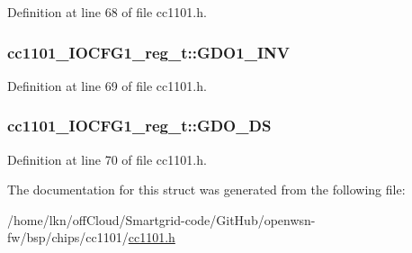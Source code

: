 Definition at line 68 of file cc1101.\+h.

\subsubsection[{\texorpdfstring{G\+D\+O1\+\_\+\+I\+NV}{GDO1_INV}}]{ cc1101\+\_\+\+I\+O\+C\+F\+G1\+\_\+reg\+\_\+t\+::\+G\+D\+O1\+\_\+\+I\+NV}\hypertarget{structcc1101___i_o_c_f_g1__reg__t_a8316bbca3a9bab5ed3a543e4c1b27cf9}{}\label{structcc1101___i_o_c_f_g1__reg__t_a8316bbca3a9bab5ed3a543e4c1b27cf9}


Definition at line 69 of file cc1101.\+h.

\subsubsection[{\texorpdfstring{G\+D\+O\+\_\+\+DS}{GDO_DS}}]{ cc1101\+\_\+\+I\+O\+C\+F\+G1\+\_\+reg\+\_\+t\+::\+G\+D\+O\+\_\+\+DS}\hypertarget{structcc1101___i_o_c_f_g1__reg__t_a89e14d3dbc30c43192ad3aa0616a7a3b}{}\label{structcc1101___i_o_c_f_g1__reg__t_a89e14d3dbc30c43192ad3aa0616a7a3b}


Definition at line 70 of file cc1101.\+h.



The documentation for this struct was generated from the following file\+:\begin{DoxyCompactItemize}
\item 
/home/lkn/off\+Cloud/\+Smartgrid-\/code/\+Git\+Hub/openwsn-\/fw/bsp/chips/cc1101/\hyperlink{cc1101_8h}{cc1101.\+h}\end{DoxyCompactItemize}

